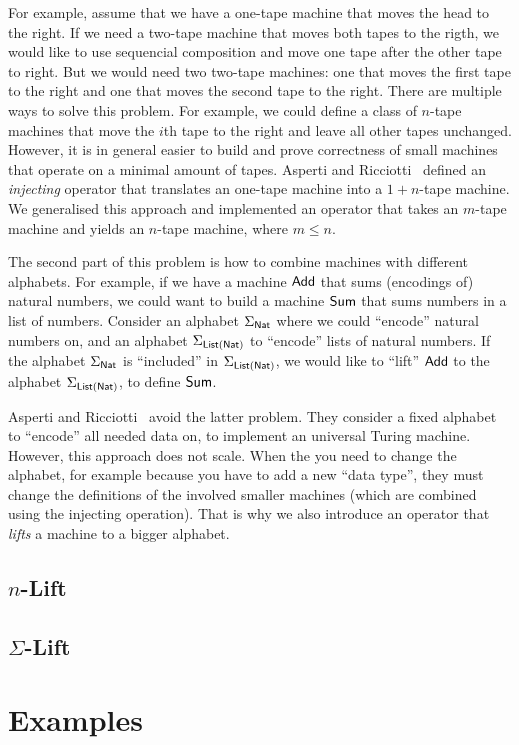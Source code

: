 For example, assume that we have a one-tape machine that moves the head to the right.  If we need a two-tape machine that moves both tapes to the
rigth, we would like to use sequencial composition and move one tape after the other tape to right.  But we would need two two-tape machines: one that
moves the first tape to the right and one that moves the second tape to the right.  There are multiple ways to solve this problem.  For example, we
could define a class of $n$-tape machines that move the $i$th tape to the right and leave all other tapes unchanged.  However, it is in general easier
to build and prove correctness of small machines that operate on a minimal amount of tapes.  Asperti and Ricciotti~\cite{asperti2015} defined an
\emph{injecting} operator that translates an one-tape machine into a $1+n$-tape machine.  We generalised this approach and implemented an operator
that takes an $m$-tape machine and yields an $n$-tape machine, where $m \le n$.

The second part of this problem is how to combine machines with different alphabets.  For example, if we have a machine $\textsf{Add}$ that sums
(encodings of) natural numbers, we could want to build a machine $\textsf{Sum}$ that sums numbers in a list of numbers.  Consider an alphabet
$\Sigma_{\textsf{Nat}}$ where we could ``encode'' natural numbers on, and an alphabet $\Sigma_{\textsf{List}(\textsf{Nat})}$ to ``encode'' lists of natural numbers.  If the
alphabet $\Sigma_{\textsf{Nat}}$ is ``included'' in $\Sigma_{\textsf{List}(\textsf{Nat})}$, we would like to ``lift'' $\textsf{Add}$ to the alphabet $\Sigma_{\textsf{List}(\textsf{Nat})}$, to
define $\textsf{Sum}$.

Asperti and Ricciotti~\cite{asperti2015} avoid the latter problem.  They consider a fixed alphabet to ``encode'' all needed data on, to implement an
universal Turing machine.  However, this approach does not scale.  When the you need to change the alphabet, for example because you have to add a new
``data type'', they must change the definitions of the involved smaller machines (which are combined using the injecting operation).  That is why we
also introduce an operator that \emph{lifts} a machine to a bigger alphabet.

\subsection{$n$-Lift}
\label{sec:n-Lift}

\todo{}


\subsection{$\Sigma$-Lift}
\label{sec:sigma-Lift}


\todo{}




\section{Examples}
\label{sec:combining-examples}




